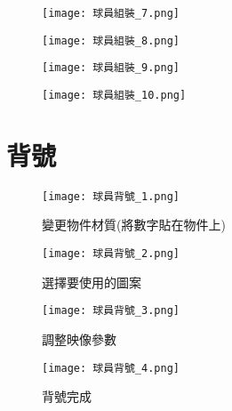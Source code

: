 \begin{figure}[hbt!]
  \begin{center}
    \texttt{[image: 球員組裝\_7.png]}
  \end{center}
  \caption[繞X軸旋轉，使Joint與物件平行]{}
  \label{fig:photo}
\end{figure}

\begin{figure}[hbt!]
  \begin{center}
    \texttt{[image: 球員組裝\_8.png]}
  \end{center}
  \caption[物件相互依附]{}
  \label{fig:photo}
\end{figure}

\begin{figure}[hbt!]
  \begin{center}
    \texttt{[image: 球員組裝\_9.png]}
  \end{center}
  \caption[調整物件傳動參數]{}
  \label{fig:photo}
\end{figure}

\begin{figure}[hbt!]
  \begin{center}
    \texttt{[image: 球員組裝\_10.png]}
  \end{center}
  \caption[調整物件質量參數]{}
  \label{fig:photo}
\end{figure}

\newpage

\section{背號}
\begin{figure}[hbt!]
  \begin{center}
    \texttt{[image: 球員背號\_1.png]}
  \end{center}
  \caption{變更物件材質(將數字貼在物件上)}
  \label{fig:photo}
\end{figure}
\begin{figure}[hbt!]
  \begin{center}
    \texttt{[image: 球員背號\_2.png]}
  \end{center}
  \caption{選擇要使用的圖案}
  \label{fig:photo}
\end{figure}
\begin{figure}[hbt!]
  \begin{center}
    \texttt{[image: 球員背號\_3.png]}
  \end{center}
  \caption{調整映像參數}
  \label{fig:photo}
\end{figure}
\begin{figure}[hbt!]
  \begin{center}
    \texttt{[image: 球員背號\_4.png]}
  \end{center}
  \caption{背號完成}
  \label{fig:photo}
\end{figure}

